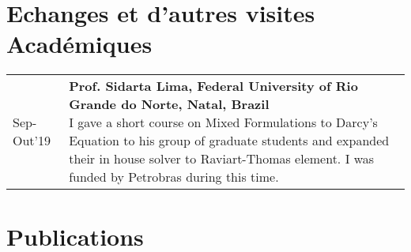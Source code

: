 \documentclass[french]{article}
\makeatletter
\newenvironment{twenty}{%
	\begin{tabular*}{\textwidth}{@{\extracolsep{\fill}}ll}
	}{%
	\end{tabular*}
}
\newcommand{\twentyitem}[4]{%
	#1&\parbox[t]{0.88\textwidth}{%
		\textbf{#2}%
		\hfill%
		{\footnotesize#3}\\%
		#4\vspace{\parsep}%
	}\\
}
\makeatother
\begin{document}
\section{Echanges et d'autres visites Académiques }

\begin{twenty}
\twentyitem{Sep-Out'19}{Prof. Sidarta Lima, Federal University of Rio Grande do Norte, Natal, Brazil}{}{I gave a short course on Mixed Formulations to Darcy's Equation to his group of graduate students and expanded their in house solver to Raviart-Thomas element. I was funded by Petrobras during this time.}
\twentyitem{Sep-Fev'18}{Prof. Eduardo de Souza Neto, Swansea University, Swansea, UK}{}{I visited the Zienkiewicz Centre for Computational Engineering (ZCCE) as part of the sandwich exchange program during my PhD. During this period, under supervision of Prof. de Souza Neto, expert in the domain of Computational Plasticity and Constitutive Multiscale theories, we developed and implemented a nouvel micromechanical inelastic model for networks of fibres. I was funded by PSDE/CAPES.}

\twentyitem{Apr'17}{Prof. Anne Robertson, University of Pittsburgh, Pittsburgh, USA} {}{I spent 20 days observing mechanical experiments in livings tissues (arteries) and collaborating with microscopic modelling of collagen tissues.}

\twentyitem{Jun-Jul'15}{Prof. Pablo Sanchez and Prof. Alfredo Huespe, Centro de Investigación de Métodos Computacionales (CIMEC), Santa Fe, Argentina}{}{As part of my thesis, I spent a month collaborating and learning from two experts in the domain of computational fracture mechanics field.}

\twentyitem{Aug-Jul'12}{Arts et Métiers Paristech (ENSAM), Paris, France}{}{I took part of undergraduate studies in a sandwich exchange program in France. I was enrolled in the third (last) year, which consisted in a  masters degree in ''Prototypage Virtuel'' (Computational Solid Mechanics) including a final research project. (Funded by  Brafitec/CAPES).}
\end{twenty}

\section{Publications}
\end{document}
